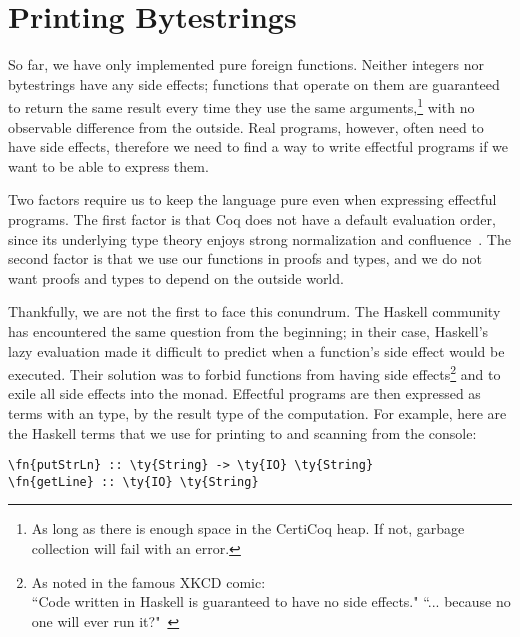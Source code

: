 \section{Printing Bytestrings}
\label{printingbytestrings}


So far, we have only implemented pure \gls{foreign function}s. Neither integers nor bytestrings have any side effects; functions that operate on them are guaranteed to return the same result every time they use the same arguments,\footnote{As long as there is enough space in the \gls{CertiCoq heap}. If not, garbage collection will fail with an error.} with no observable difference from the outside. Real programs, however, often need to have side effects, therefore we need to find a way to write effectful programs if we want to be able to express them.

Two factors require us to keep the language pure even when expressing effectful programs. The first factor is that Coq does not have a default evaluation order, since its underlying type theory enjoys strong normalization and confluence~\cite{coquand1985, werner1994}. The second factor is that we use our functions in proofs and types, and we do not want proofs and types to depend on the outside world.

Thankfully, we are not the first to face this conundrum. The Haskell community has encountered the same question from the beginning; in their case, Haskell's lazy evaluation made it difficult to predict when a function's side effect would be executed. Their solution was to forbid functions from having side effects\footnote{As noted in the famous XKCD comic:\\``Code written in Haskell is guaranteed to have no side effects." ``... because no one will ever run it?"~\cite{xkcd:haskell}} and to exile all side effects into the  monad. Effectful programs are then expressed as terms with an  type, \parametrized{} by the result type of the computation. For example, here are the Haskell terms that we use for printing to and scanning from the console:

\begin{Verbatim}
\fn{putStrLn} :: \ty{String} -> \ty{IO} \ty{String}
\fn{getLine} :: \ty{IO} \ty{String}
\end{Verbatim}

